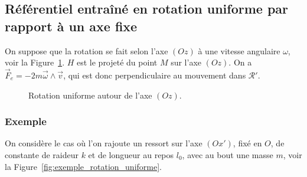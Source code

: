     \subsection{Référentiel entraîné en rotation uniforme par rapport à un axe fixe}

        On suppose que la rotation se fait selon l'axe $(Oz)$ à une vitesse angulaire $\omega$, voir la Figure~\ref{fig:rotation_uniforme}. $H$ est le projeté du point $M$ sur l'axe $(Oz)$. On a $\vec{F}_e=-2m\vec{\omega}\wedge\vec{v}$, qui est donc perpendiculaire au mouvement dans $\mathcal{R}'$.

        \begin{figure}
            \centering
            \caption{Rotation uniforme autour de l'axe $(Oz)$.}    
            \label{fig:rotation_uniforme}
        \end{figure}

        \subsubsection{Exemple}

            On considère le cas où l'on rajoute un ressort sur l'axe $(Ox')$, fixé en $O$, de constante de raideur $k$ et de longueur au repos $l_0$, avec au bout une masse $m$, voir la Figure~\ref{fig:exemple_rotation_uniforme}.           

